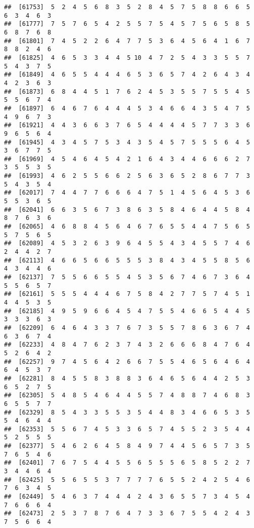 \documentclass[
]{book}
\begin{document}
\begin{verbatim}
##  [61753]  5  2  4  5  6  8  3  5  2  8  4  5  7  5  8  8  6  6  5  6  3  4  6  3
##  [61777]  7  5  7  6  5  4  2  5  5  7  5  4  5  7  5  6  5  8  5  6  8  7  6  8
##  [61801]  7  4  5  2  2  6  4  7  7  5  3  6  4  5  6  4  1  6  7  8  8  2  4  6
##  [61825]  4  6  5  3  3  4  4  5 10  4  7  2  5  4  3  3  5  5  7  5  4  3  7  5
##  [61849]  4  6  5  5  4  4  4  6  5  3  6  5  7  4  2  6  4  3  4  4  2  3  6  3
##  [61873]  6  8  4  4  5  1  7  6  2  4  5  3  5  5  7  5  5  4  5  5  5  6  7  4
##  [61897]  6  4  6  7  6  4  4  4  5  3  4  6  6  4  3  5  4  7  5  4  9  6  7  3
##  [61921]  4  4  3  6  6  3  7  6  5  4  4  4  4  5  7  7  3  3  6  9  6  5  6  4
##  [61945]  4  3  4  5  7  5  3  4  3  5  4  5  7  5  5  5  6  4  5  3  6  7  7  5
##  [61969]  4  5  4  6  4  5  4  2  1  6  4  3  4  4  6  6  6  2  7  3  5  5  3  5
##  [61993]  4  6  2  5  5  6  6  2  5  6  3  6  5  2  8  6  7  7  3  5  4  3  5  4
##  [62017]  7  4  4  7  7  6  6  6  4  7  5  1  4  5  6  4  5  3  6  5  5  3  6  5
##  [62041]  6  6  3  5  6  7  3  8  6  3  5  8  4  6  4  4  5  8  4  8  7  6  3  6
##  [62065]  4  6  8  8  4  5  6  4  6  7  6  5  5  4  4  7  5  6  5  5  7  5  6  5
##  [62089]  4  5  3  2  6  3  9  6  4  5  5  4  3  4  5  5  7  4  6  2  4  4  2  7
##  [62113]  4  6  6  5  6  6  5  5  5  3  8  4  3  4  5  5  8  5  6  4  3  4  4  6
##  [62137]  7  5  5  6  6  5  5  4  5  3  5  6  7  4  6  7  3  6  4  5  5  6  5  7
##  [62161]  5  5  5  4  4  4  6  7  5  8  4  2  7  7  5  7  4  5  1  4  4  5  3  5
##  [62185]  4  9  5  9  6  6  4  5  4  7  5  5  4  6  6  5  4  4  5  3  3  3  6  3
##  [62209]  6  4  6  4  3  3  7  6  7  3  5  5  7  8  6  3  6  7  4  6  3  6  7  4
##  [62233]  4  8  4  7  6  2  3  7  4  3  2  6  6  6  8  4  7  6  4  5  2  6  4  2
##  [62257]  9  7  4  5  6  4  2  6  6  7  5  5  4  6  5  6  4  6  4  6  4  5  3  7
##  [62281]  8  4  5  5  8  3  8  8  3  6  4  6  5  6  4  4  2  5  3  6  5  2  7  5
##  [62305]  5  4  8  5  4  6  4  4  5  5  7  4  8  8  7  4  6  8  3  6  5  5  7  7
##  [62329]  8  5  4  3  3  5  5  3  5  4  4  8  3  4  6  6  5  3  5  5  4  6  4  4
##  [62353]  5  5  6  7  4  5  3  3  6  5  7  4  5  5  2  3  5  4  4  5  2  5  5  5
##  [62377]  5  4  6  2  6  4  5  8  4  9  7  4  4  5  6  5  7  3  5  7  6  5  4  6
##  [62401]  7  6  7  5  4  4  5  5  6  5  5  5  6  5  8  5  2  2  7  3  4  4  6  4
##  [62425]  5  5  6  5  5  3  7  7  7  7  6  5  5  2  4  2  5  4  6  7  6  3  4  5
##  [62449]  5  4  6  3  7  4  4  4  2  4  3  6  5  5  7  3  4  5  4  7  6  6  6  4
##  [62473]  2  5  3  7  8  7  6  4  7  3  3  6  7  5  5  4  2  4  3  7  5  6  6  4

\end{verbatim}
\end{document}
